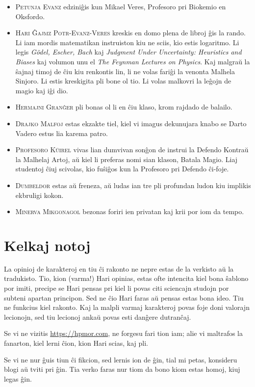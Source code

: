 \begin{itemize}
\item \textsc{Petunja Evanz} edziniĝis kun Mikael Veres, Profesoro pri Biokemio en Oksfordo.
\item \textsc{Hari Ĝajmz Potr-Evanz-Veres} kreskis en domo plena de libroj ĝis la rando. Li iam mordis matematikan instruiston kiu ne sciis, kio estis logaritmo. Li legis \emph{Gödel, Escher, Bach} kaj \emph{Judgment Under Uncertainty: Heuristics and Biases} kaj volumon unu el \emph{The Feynman Lectures on Physics}. Kaj malgraŭ la ŝajnaj timoj de ĉiu kiu renkontis lin, li ne volas fariĝi la venonta Malhela Sinjoro. Li estis kreskigita pli bone ol tio. Li volas malkovri la leĝojn de magio kaj iĝi dio.
\item \textsc{Hermajni Granĝer} pli bonas ol li en ĉiu klaso, krom rajdado de balailo.
\item \textsc{Drajko Malfoj} estas ekzakte tiel, kiel vi imagus dekunujara knabo se Darto Vadero estus lia karema patro.
\item \textsc{Profesoro Kŭirel} vivas lian dumvivan sonĝon de instrui la Defendo Kontraŭ la Malhelaj Artoj, aŭ kiel li preferas nomi sian klason, Batala Magio. Liaj studentoj ĉiuj scivolas, kio fuŝiĝos kun la Profesoro pri Defendo ĉi-foje.
\item \textsc{Dumbeldor} estas aŭ freneza, aŭ ludas ian tre pli profundan ludon kiu implikis ekbruligi kokon.
\item \textsc{Minerva Mikgonagol} bezonas foriri ien privatan kaj krii por iom da tempo.
\end{itemize}

%
%

\section*{Kelkaj notoj}
La opinioj de karakteroj en tiu ĉi rakonto ne nepre estas de la verkisto aŭ la tradukisto. Tio, kion (varma!) Hari opinias, estas ofte intencita kiel bona ŝablono por imiti, precipe se Hari pensas pri kiel li povas citi sciencajn studojn por subteni apartan principon. Sed ne ĉio Hari faras aŭ pensas estas bona ideo. Tiu ne funkcius kiel rakonto. Kaj la malpli varmaj karakteroj povas foje doni valorajn lecionojn, sed tiu lecionoj ankaŭ povas esti danĝere dutranĉaj.

Se vi ne vizitis \url{https://hpmor.com}, ne forgesu fari tion iam; alie vi maltrafos la fanarton, kiel lerni ĉion, kion Hari scias, kaj pli.

Se vi ne nur ĝuis tiun ĉi fikcion, sed lernis ion de ĝin, tial mi petas, konsideru blogi aŭ tviti pri ĝin. Tia verko faras nur tiom da bono kiom estas homoj, kiuj legas ĝin.

